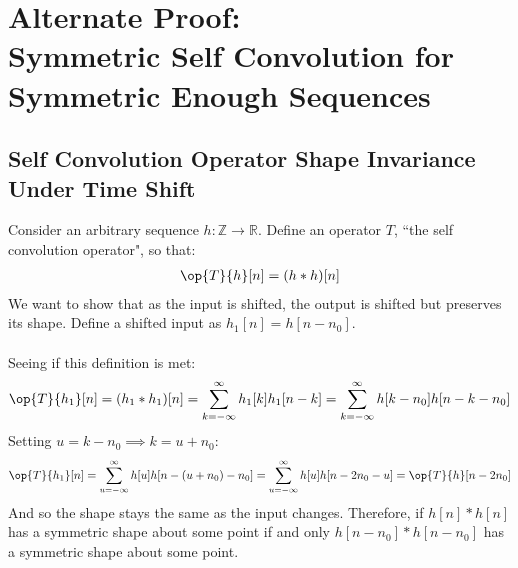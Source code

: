 \section*{Alternate Proof: \\ Symmetric Self Convolution for Symmetric Enough Sequences}
\subsection*{Self Convolution Operator Shape Invariance Under Time Shift}
Consider an arbitrary sequence $h: \mathbb{Z} \rightarrow \mathbb{R}$. Define an operator $T$, ``the self convolution operator", so that:
\begin{align*}
\op{T}{h}[n] = (h*h)[n]
\end{align*}
We want to show that as the input is shifted, the output is shifted but preserves its shape. Define a shifted input as $h_1[n] = h[n-n_0]$.
\\\\
Seeing if this definition is met:
\begin{align*}
\op{T}{h_1}[n] = (h_1*h_1)[n] =  \sum_{k=-\infty}^{\infty}h_1[k]h_1[n-k] = \sum_{k=-\infty}^{\infty}h[k - n_0]h[n-k-n_0]
\end{align*}
Setting $u = k - n_0 \implies k = u + n_0$:
\begin{align*}
\op{T}{h_1}[n] =  \sum_{u=-\infty}^{\infty}h[u]h[n-(u+n_0)-n_0] =\sum_{u=-\infty}^{\infty}h[u]h[n-2n_0 -u] = \op{T}{h}[n-2n_0]
\end{align*}
And so the shape stays the same as the input changes. Therefore, if $h[n]*h[n]$ has a symmetric shape about some point if and only $h[n-n_0]*h[n-n_0]$ has a symmetric shape about some point.

